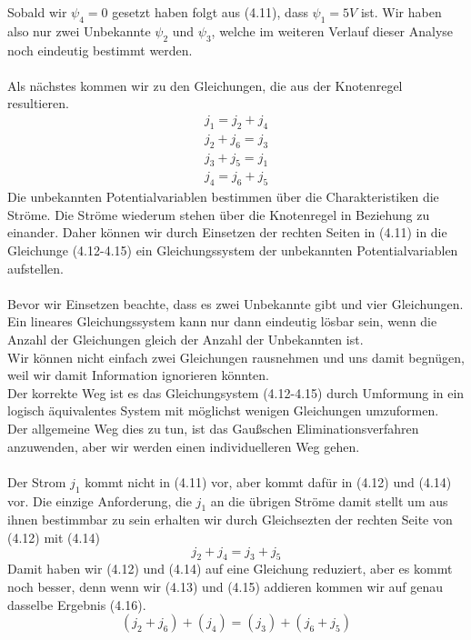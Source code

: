 \documentclass[11pt,a4paper,leqno]{report}
\numberwithin{equation}{chapter}
\begin{document}
\noindent
Sobald wir $\psi_4 = 0$ gesetzt haben folgt aus (4.11), dass $\psi_1 = 5V$ ist. Wir haben also nur zwei Unbekannte $\psi_2$ und $\psi_3$, welche im weiteren Verlauf dieser Analyse noch eindeutig bestimmt werden.\\
\\
Als n\"achstes kommen wir zu den Gleichungen, die aus der Knotenregel resultieren.
\begin{align} 
j_1 = j_2 + j_4\\
j_2 + j_6 = j_3\\
j_3 + j_5 = j_1\\
j_4 = j_6 + j_5
\end{align}
Die unbekannten Potentialvariablen bestimmen \"uber die Charakteristiken die Str\"ome. Die Str\"ome wiederum stehen \"uber die Knotenregel in Beziehung zu einander. Daher k\"onnen wir durch Einsetzen der rechten Seiten in (4.11) in die Gleichunge (4.12-4.15) ein Gleichungssystem der unbekannten Potentialvariablen aufstellen.\\
\\
Bevor wir Einsetzen beachte, dass es zwei Unbekannte gibt und vier Gleichungen. Ein lineares Gleichungssystem kann nur dann eindeutig l\"osbar sein, wenn die Anzahl der Gleichungen gleich der Anzahl der Unbekannten ist.\\
Wir k\"onnen nicht einfach zwei Gleichungen rausnehmen und uns damit begn\"ugen, weil wir damit Information ignorieren k\"onnten.\\
Der korrekte Weg ist es das Gleichungsystem (4.12-4.15) durch Umformung in ein logisch \"aquivalentes System mit m\"oglichst wenigen Gleichungen umzuformen.\\
Der allgemeine Weg dies zu tun, ist das Gau\ss{}schen Eliminationsverfahren anzuwenden, aber wir werden einen individuelleren Weg gehen.\\
\\
Der Strom $j_1$ kommt nicht in (4.11) vor, aber kommt daf\"ur in (4.12) und (4.14) vor. Die einzige Anforderung, die $j_1$ an die \"ubrigen Str\"ome damit stellt um aus ihnen bestimmbar zu sein erhalten wir durch Gleichsezten der rechten Seite von (4.12) mit (4.14)
\begin{equation}
	j_2 + j_4 = j_3 + j_5
\end{equation}
Damit haben wir (4.12) und (4.14) auf eine Gleichung reduziert, aber es kommt noch besser, denn wenn wir (4.13) und (4.15) addieren kommen wir auf genau dasselbe Ergebnis (4.16).
\begin{equation*}
(j_2 + j_6) + (j_4) = (j_3) + (j_6 + j_5)
\end{equation*}
\end{document}

